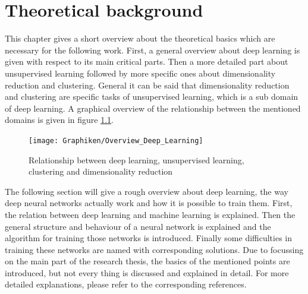 \documentclass[12pt,DIV14,BCOR12mm,a4paper,footexclude,headinclude,halfparskip-,twoside,openright,cleardoubleempty,idxtotoc,bibtotoc,listtotoc,abstracton]{scrreprt} %
\numberwithin{equation}{chapter}
\begin{document}
\chapter{Theoretical background}
This chapter gives a short overview about the theoretical basics which are necessary for the following work. First, a general overview about deep learning is given with respect to its main critical parts. Then a more detailed part about unsupervised learning followed by more specific ones about dimensionality reduction and clustering. General it can be said that dimensionality reduction and clustering are specific tasks of unsupervised learning, which is a sub domain of deep learning. A graphical overview of the relationship between the mentioned domains is given in figure \ref{fig:Relationship_DL}. 
\begin{figure}[htb!]
	\centering
	\texttt{[image: Graphiken/Overview\_Deep\_Learning]}
	\caption{Relationship between deep learning, unsupervised learning, clustering and dimensionality reduction}
	\label{fig:Relationship_DL}
\end{figure}
The following section will give a rough overview about deep learning, the way deep neural networks actually work and how it is possible to train them. First, the relation between deep learning and machine learning is explained. Then the general structure and behaviour of a neural network is explained and the algorithm for training those networks is introduced. Finally some difficulties in training these networks are named with corresponding solutions. Due to focussing on the main part of the research thesis, the basics of the mentioned points are introduced, but not every thing is discussed and explained in detail. For more detailed explanations, please refer to the corresponding references.\\
\end{document}
